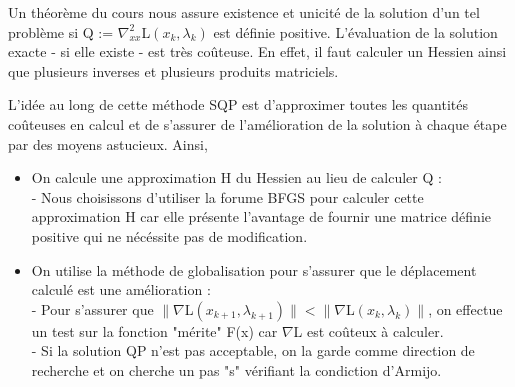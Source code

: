 \par 
Un théorème du cours nous assure existence et unicité de la solution d'un tel problème si Q := $\nabla_{xx}^2 $L$(x_k,\lambda_k)$ est définie positive.
L'évaluation de la solution exacte - si elle existe - est très coûteuse. En effet, il faut calculer un Hessien ainsi que plusieurs inverses et plusieurs produits matriciels. \\
\par 
L'idée au long de cette méthode SQP est d'approximer toutes les quantités coûteuses en calcul et de s'assurer de l'amélioration de la solution à chaque étape par des moyens astucieux.\medbreak
Ainsi,\\
\renewcommand{\labelitemi}{\textbullet}
\begin{itemize}
\item On calcule une approximation H du Hessien au lieu de calculer Q : \\
- Nous choisissons d'utiliser la forume BFGS pour calculer cette approximation H car elle présente l'avantage de fournir 
une matrice définie positive qui ne nécéssite pas de modification.\\
\item On utilise la méthode de globalisation pour s'assurer que le déplacement calculé est une amélioration :\\
\indent- Pour s'assurer que $\|    \nabla $L$(x_{k+1},\lambda_{k+1})   \| < \|    \nabla $L$(x_{k},\lambda_{k})   \|$,
on effectue un test sur la fonction "mérite" F(x) car $\nabla $L est coûteux à calculer. \\
\indent- Si la solution QP n'est pas acceptable, on la garde comme direction de recherche et on cherche un pas "s" vérifiant la condiction d'Armijo.\\
\end{itemize}
\par

